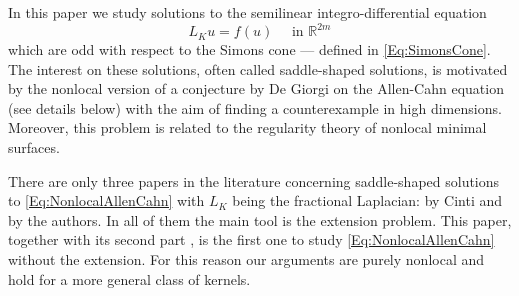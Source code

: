 \documentclass[12pt,reqno]{amsart}
\theoremstyle{definition}
\theoremstyle{remark}
\newcommand{\con}[1]{\mathbb{#1}}
\newcommand{\R}{\con{R}} %
\numberwithin{equation}{section}
\begin{document}
In this paper we study solutions to the semilinear integro-differential equation
\begin{equation}
\label{Eq:NonlocalAllenCahn}
L_K u = f(u) \quad \textrm{ in } \R^{2m}
\end{equation}
which are odd with respect to the Simons cone --- defined in \eqref{Eq:SimonsCone}. The interest on these solutions, often called saddle-shaped solutions, is motivated by the nonlocal version of a conjecture by De Giorgi on the Allen-Cahn equation (see details below) with the aim of finding a counterexample in high dimensions. Moreover, this problem is related to the regularity theory of nonlocal minimal surfaces.

There are only three papers in the literature concerning saddle-shaped solutions to \eqref{Eq:NonlocalAllenCahn} with $L_K$ being the fractional Laplacian: \cite{Cinti-Saddle, Cinti-Saddle2} by Cinti and \cite{Felipe-Sanz-Perela:SaddleFractional} by the authors. In all of them the main tool is the extension problem. This paper, together with its second part  \cite{FelipeSanz-Perela:IntegroDifferentialII}, is the first one to study \eqref{Eq:NonlocalAllenCahn} without the extension. For this reason our arguments are purely nonlocal and hold for a more general class of kernels.


\end{document}
